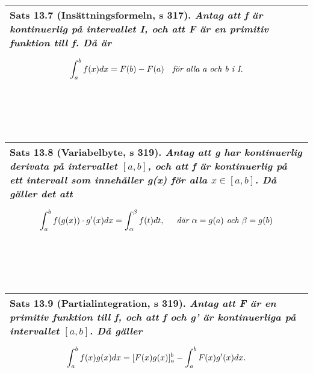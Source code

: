 \documentclass[a4paper]{article}
\begin{document}
\\\\\\
\begin{tabular}{|L{11.5cm}|} \hline
\textbf{Sats 13.7} (Insättningsformeln, s 317).
\textit{Antag att f är kontinuerlig på intervallet I, och att F är en primitiv funktion till f. Då är}
\begin{equation*}
\renewcommand{\arraystretch}{2.5}
\begin{array}{>{\displaystyle}cc}
\int_{a}^{b}f(x)dx=F(b)-F(a) & \textit{för alla a och b i I.}
\end{array}
\end{equation*}
\\\hline
\end{tabular}
\\\\\\
\begin{tabular}{|L{11.5cm}|} \hline
\textbf{Sats 13.8} (Variabelbyte, s 319).
\textit{Antag att g har kontinuerlig derivata på intervallet $[a,b]$, och att f är kontinuerlig på ett intervall som innehåller g(x) för alla $x\in [a,b]$. Då gäller det att}
\begin{equation*}
\renewcommand{\arraystretch}{2.5}
\begin{array}{>{\displaystyle}c}
\int_{a}^{b}f(g(x))\cdot g'(x)dx = \int_{\alpha}^{\beta} f(t)dt, \hspace{0.5cm} \textit{där $\alpha=g(a)$ och $\beta=g(b)$}
\end{array}
\end{equation*}
\\\hline
\end{tabular}
\\\\\\
\begin{tabular}{|L{11.5cm}|} \hline
\textbf{Sats 13.9} (Partialintegration, s 319).
\textit{Antag att F är en primitiv funktion till f, och att f och g' är kontinuerliga på intervallet $[a,b]$. Då gäller}
\begin{equation*}
\renewcommand{\arraystretch}{2.5}
\begin{array}{>{\displaystyle}c}
\int_{a}^{b}f(x)g(x)dx=[F(x)g(x)]_{a}^{b}-\int_{a}^{b}F(x)g'(x)dx.
\end{array}
\end{equation*}
\\\hline
\end{tabular}
\\\\\\
\end{document}
